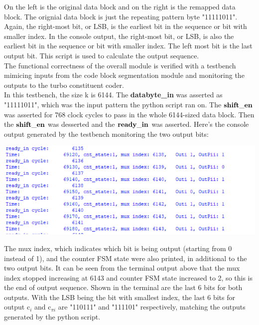 \documentclass[letterpaper, 12pt]{article} %
\begin{document}
On the left is the original data block and on the right is the remapped data block. The orignial data block is just the repeating pattern byte "11111011". Again, the right-most bit, or LSB, is the earliest bit in the sequence or bit with smaller index. In the console output, the right-most bit, or LSB, is also the earliest bit in the sequence or bit with smaller index. The left most bit is the last output bit. This script is used to calculate the output sequence.\\

The functional correctness of the overall module is verified with a testbench mimicing inputs from the code block segmentation module and monitoring the outputs to the turbo constituent coder.\\ 

In this testbench, the size k is 6144. The {\bf databyte\_in} was asserted as "11111011", which was the input pattern the python script ran on. The ${\bf  shift\_en}$ was asserted for 768 clock cycles to pass in the whole 6144-sized data block. Then the  ${\bf  shift\_en}$ was desserted and the ${\bf  ready\_in}$ was asserted. Here's the console output generated by the testbench monitoring the two output bits:\\

\begin{minipage}{1.0\textwidth}
\includegraphics[width=14cm, angle=0]{files/modelsim_result.png}
\centering
{}
\centering
\end{minipage}
\bigskip

The mux index, which indicates which bit is being output (starting from 0 instead of 1), and the counter FSM state were also printed, in additional to the two output bits. It can be seen from the terminal output above that the mux index stopped increasing at 6143 and counter FSM state increased to 2, so this is the end of output sequence. Shown in the terminal are the last 6 bits for both outputs. With the LSB being the bit with smallest index, the last 6 bits for output c$_{i}$ and c$_{\pi i}$ are "110111" and "111101" respectively, matching the outputs generated by the python script.\\
\end{document}
